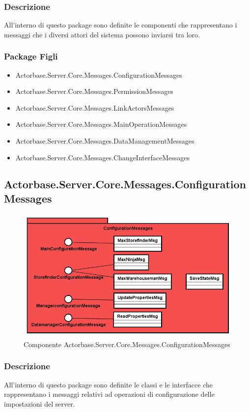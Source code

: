 \documentclass[a4paper]{article}
\begin{document}
			\subsubsection{Descrizione}
				All'interno di questo package sono definite le componenti che rappresentano i messaggi che i diversi attori del sistema possono inviarsi tra loro.
			\subsubsection{Package Figli}
			\begin{itemize}
				\item Actorbase.Server.Core.Messages.ConfigurationMessages
				\item Actorbase.Server.Core.Messages.PermissionMessages
				\item Actorbase.Server.Core.Messages.LinkActorsMessages
				\item Actorbase.Server.Core.Messages.MainOperationMessages
				\item Actorbase.Server.Core.Messages.DataManagementMessages
				\item Actorbase.Server.Core.Messages.ChangeInterfaceMessages
			\end{itemize}
			
			\subsection{Actorbase.Server.Core.Messages.ConfigurationMessages}
			\begin{figure} [H]
			\centering
			\includegraphics[scale=0.55]{Server/Package/ConfigurationMessagesLevel.png}
			\caption{Componente Actorbase.Server.Core.Messages.ConfigurationMessages}
			\end{figure}
			\subsubsection{Descrizione}
				All'interno di questo package sono definite le classi e le interfacce che rappresentano i messaggi relativi ad operazioni di configurazione delle impostazioni del server.
\end{document}
